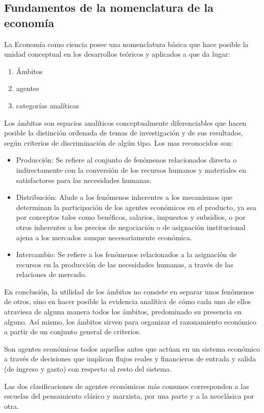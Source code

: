 \subsection{Fundamentos de la nomenclatura de la economía}
La Economía como ciencia posee una nomenclatura básica que hace posible la unidad conceptual en los desarrollos teóricos y aplicados a que da lugar:
\begin{enumerate}
    \item Ámbitos
    \item agentes
    \item categorías analíticas
\end{enumerate}
Los ámbitos son espacios analíticos conceptualmente diferenciables que hacen posible la distinción ordenada de temas de investigación y de sus resultados, según criterios de discriminación de algún tipo. Los mas reconocidos son:
\begin{itemize}
    \item Producción: Se refiere al conjunto de fenómenos relacionados directa o indirectamente con la conversión de los recursos humanos y materiales en satisfactores para las necesidades humanas.
    \item Distribución: Alude a los fenómenos inherentes a los mecanismos que determinan la participación de los agentes económicos en el producto, ya sea por conceptos tales como benéficos, salarios, impuestos y subsidios, o por otros inherentes a los precios de negociación o de asignación institucional ajena a los mercados aunque necesariamente económica.
    \item Intercambio: Se refiere a los fenómenos relacionados a la asignación de recursos en la producción de las necesidades humanas, a través de las relaciones de mercado.
\end{itemize}
En conclusión, la utilidad de los ámbitos no consiste en separar unos fenómenos de otros, sino en hacer posible la evidencia analítica de cómo cada uno de ellos atraviesa de alguna manera todos los ámbitos, predominado su presencia en alguno. Así mismo, los ámbitos sirven para organizar el razonamiento económico a partir de un conjunto general de criterios.

Son agentes económicos todos aquellos antes que actúan en un sistema económico a través de decisiones que implican flujos reales y financieros de entrada y salida (de ingreso y gasto) con respecto al resto del sistema.

Las dos clasificaciones de agentes económicos más comunes corresponden a las escuelas del pensamiento clásico y marxista, por una parte y a la neoclásica por otra.

